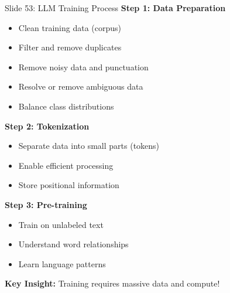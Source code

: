 \documentclass[8pt]{beamer}
\begin{document}
	\begin{frame}{Slide 53: LLM Training Process}
		\fontsize{6.5}{7.5}\selectfont
		\textbf{Step 1: Data Preparation}
		\begin{itemize}
			\item Clean training data (corpus)
			\item Filter and remove duplicates
			\item Remove noisy data and punctuation
			\item Resolve or remove ambiguous data
			\item Balance class distributions
		\end{itemize}
		
		\vspace{0.1cm}
		\textbf{Step 2: Tokenization}
		\begin{itemize}
			\item Separate data into small parts (tokens)
			\item Enable efficient processing
			\item Store positional information
		\end{itemize}
		
		\vspace{0.1cm}
		\textbf{Step 3: Pre-training}
		\begin{itemize}
			\item Train on unlabeled text
			\item Understand word relationships
			\item Learn language patterns
		\end{itemize}
		
		\textcolor{myblue}{\textbf{Key Insight:}} Training requires massive data and compute!
	\end{frame}
	
\end{document}
